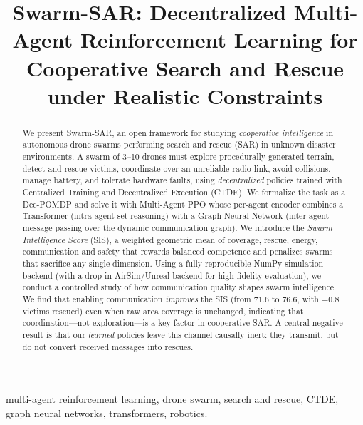 \documentclass[conference]{IEEEtran}
\begin{document}
\title{Swarm-SAR: Decentralized Multi-Agent Reinforcement Learning for\\
Cooperative Search and Rescue under Realistic Constraints}

\author{
}

\maketitle

\begin{abstract}
We present Swarm-SAR, an open framework for studying \emph{cooperative
intelligence} in autonomous drone swarms performing search and rescue (SAR) in
unknown disaster environments. A swarm of 3--10 drones must explore procedurally
generated terrain, detect and rescue victims, coordinate over an unreliable radio
link, avoid collisions, manage battery, and tolerate hardware faults, using
\emph{decentralized} policies trained with Centralized Training and Decentralized
Execution (CTDE). We formalize the task as a Dec-POMDP and solve it with
Multi-Agent PPO whose per-agent encoder combines a Transformer (intra-agent set
reasoning) with a Graph Neural Network (inter-agent message passing over the
dynamic communication graph). We introduce the \emph{Swarm Intelligence Score}
(SIS), a weighted geometric mean of coverage, rescue, energy, communication and
safety that rewards balanced competence and penalizes swarms that sacrifice any
single dimension. Using a fully reproducible NumPy simulation backend (with a
drop-in AirSim/Unreal backend for high-fidelity evaluation), we conduct a
controlled study of how communication quality shapes swarm intelligence. We find
that enabling communication \emph{improves} the SIS (from $71.6$ to $76.6$, with
$+0.8$ victims rescued) even when raw area coverage is unchanged, indicating that
coordination---not exploration---is a key factor in cooperative SAR. A central
negative result is that our \emph{learned} policies leave this channel causally
inert: they transmit, but do not convert received messages into rescues.
\end{abstract}

\begin{IEEEkeywords}
multi-agent reinforcement learning, drone swarm, search and rescue, CTDE,
graph neural networks, transformers, robotics.
\end{IEEEkeywords}
\end{document}
